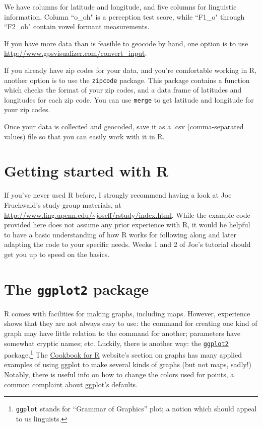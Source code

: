 \documentclass[12pt]{article}
\begin{document}
\noindent We have columns for latitude and longitude, and five columns for linguistic information. Column ``o\_oh" is a perception test score, while ``F1\_o" through ``F2\_oh" contain vowel formant measurements.

If you have more data than is feasible to geocode by hand, one option is to use \url{http://www.gpsvisualizer.com/convert_input}.

If you already have zip codes for your data, and you're comfortable working in R, another option is to use the \texttt{zipcode} package. This package contains a function which checks the format of your zip codes, and a data frame of latitudes and longitudes for each zip code. You can use \texttt{merge} to get latitude and longitude for your zip codes.

Once your data is collected and geocoded, save it as a .csv (comma-separated values) file so that you can easily work with it in R.

\section{Getting started with R}
If you've never used R before, I strongly recommend having a look at Joe Fruehwald's study group materials, at \url{http://www.ling.upenn.edu/~joseff/rstudy/index.html}. While the example code provided here does not assume any prior experience with R, it would be helpful to have a basic understanding of how R works for following along and later adapting the code to your specific needs. Weeks 1 and 2 of Joe's tutorial should get you up to speed on the basics.

\section{The \texttt{ggplot2} package}

R comes with facilities for making graphs, including maps.  However,
experience shows that they are not always easy to use: the command for
creating one kind of graph may have little relation to the command for
another; parameters have somewhat cryptic names; etc.  Luckily, there is
another way: the \href{http://ggplot2.org/}{\texttt{ggplot2}}
package.\footnote{\texttt{ggplot} stands for “Grammar of Graphics” plot;
    a notion which should appeal to us linguists.}  The
\href{http://www.cookbook-r.com/Graphs/}{Cookbook for R} website’s
section on graphs has many applied examples of using ggplot to make
several kinds of graphs (but not maps, sadly!)  Notably, there is useful
info on how to change the colors used for points, a common complaint
about ggplot’s defaults.
\end{document}
